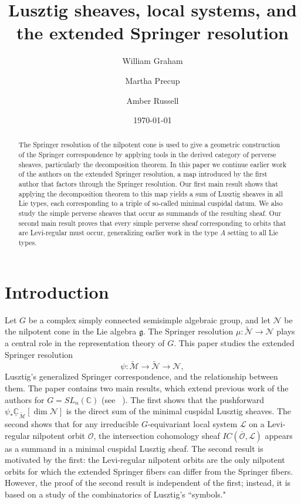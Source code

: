 \documentclass[reqno,11pt]{amsart}
\title[Extended Springer Resolution]{Lusztig sheaves, local systems, and the extended Springer resolution}
\author{William Graham}
\author{Martha Precup}
\author{Amber Russell}
\date{\today}
\theoremstyle{remark}
\theoremstyle{remark}
\theoremstyle{definition}
\theoremstyle{definition}
\theoremstyle{definition}
\numberwithin{equation}{section}
\newcommand{\C}{\mathbb{C}}           %
\newcommand{\fg}{{\mathfrak g}}
\newcommand{\cl}{\mathcal{L}}
\newcommand{\cm}{\mathcal{M}}
\newcommand{\cn}{\mathcal{N}}
\newcommand{\co}{\mathcal{O}}
\newcommand{\shc}{\underline{\C}}
\renewcommand{\tilde}{\widetilde}
\begin{document}
\parskip=4pt \baselineskip=14pt


\begin{abstract} The Springer resolution of the nilpotent cone is used to give a geometric construction of the Springer correspondence by applying tools in the derived category of perverse sheaves, particularly the decomposition theorem. In this paper we continue earlier work of the authors on the extended Springer resolution, a map introduced by the first author that factors through the Springer resolution.  Our first main result shows that applying the decomposition theorem to this map yields a sum of Lusztig sheaves in all Lie types, each corresponding to a triple of so-called minimal cuspidal datum.  We also study the simple perverse sheaves that occur as summands of the resulting sheaf. Our second main result proves that every simple perverse sheaf corresponding to orbits that are Levi-regular must occur, generalizing earlier work in the type $A$ setting to all Lie types.  
\end{abstract}



\maketitle

\tableofcontents



\section{Introduction}\label{sec.intro}
Let $G$ be a complex simply connected semisimple algebraic group, and let $\cn$ be the nilpotent cone in the Lie algebra $\fg$.
The Springer resolution $\mu: \tilde{\cn} \to \cn$ plays a central role in the representation theory of $G$.
This paper studies the extended Springer resolution
\[
\psi: \tilde{\cm} \to \tilde{\cn} \to \cn,
\]
Lusztig's generalized Springer correspondence, and the relationship between them.  The paper
contains two main results, which extend previous work of the authors for $G = SL_n(\C)$ (see ~\cite{GPR23}).  The first
shows that the pushforward $\psi_* \shc_{\tilde{\cm}}[\dim \cn]$ is the direct sum of the minimal cuspidal Lusztig sheaves.
The second shows that for any irreducible $G$-equivariant local system $\cl$ on a Levi-regular nilpotent orbit $\co$, the intersection
cohomology sheaf $IC(\overline{\co}, \cl)$ appears as a summand in a minimal cuspidal Lusztig sheaf.  The second result
is motivated by the first: the Levi-regular nilpotent orbits are the only nilpotent orbits for which the extended Springer
fibers can differ from the Springer fibers.  However, the proof of the second result is independent of the first; instead,
it is based on a study of the combinatorics of Lusztig's ``symbols."
\end{document}
